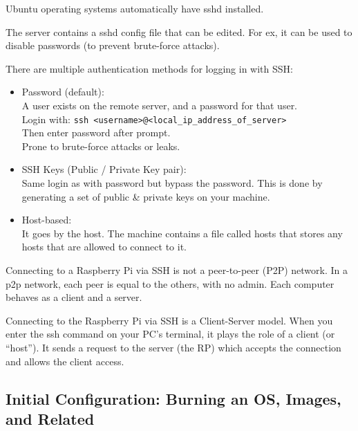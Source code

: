 \documentclass[a4paper, 10pt]{article}
\begin{document}
                Ubuntu operating systems automatically have sshd installed. 

                The server contains a sshd config file that can be edited. For ex, it can be used to disable passwords (to prevent brute-force attacks).

                There are multiple authentication methods for logging in with SSH:
                \begin{itemize}
                \item Password (default):\\
                    A user exists on the remote server, and a password for that user.\\
                    Login with: \texttt{ssh <username>@<local\_ip\_address\_of\_server>} \\
                    Then enter password after prompt.\\ 
                    Prone to brute-force attacks or leaks.
                
                \item SSH Keys (Public / Private Key pair):\\
                    Same login as with password but bypass the password. This is done by generating a set of public & private keys on your machine.
                
                \item Host-based: \\
                    It goes by the host. The machine contains a file called hosts that stores any hosts that are allowed to connect to it.
                \end{itemize}
                
                Connecting to a Raspberry Pi via SSH is not a peer-to-peer (P2P) network. In a p2p network, each peer is equal to the others, with no admin. Each computer behaves as a client and a server.
                
                Connecting to the Raspberry Pi via SSH is a Client-Server model. When you enter the ssh command on your PC’s terminal, it plays the role of a client (or “host”). It sends a request to the server (the RP) which accepts the connection and allows the client access.

    \subsection{Initial Configuration: Burning an OS, Images, and Related}  
\end{document}
